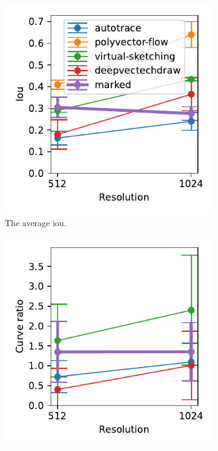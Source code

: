 \begin{figure}[h]
    \centering
    \begin{subfigure}{.3\textwidth}
    \centering
    \includegraphics[width=\textwidth]{graphics/eval/iou_1024-1.024_True_sketchbench.pdf}
    \caption{The average \gls{iou}.}
\end{subfigure}
    \begin{subfigure}{.3\textwidth}
    \centering
    \includegraphics[width=\textwidth]{graphics/eval/curve ratio_1024-1.024_True_sketchbench.pdf}

\end{subfigure}
\end{figure}
